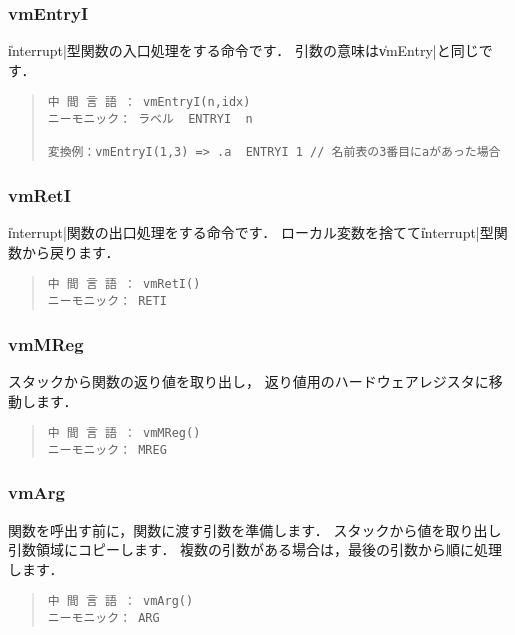 \subsubsection{vmEntryI}

\|interrupt|型関数の入口処理をする命令です．
引数の意味は\|vmEntry|と同じです．

\begin{quote}
\begin{verbatim}
中 間 言 語 ： vmEntryI(n,idx)
ニーモニック： ラベル  ENTRYI  n

変換例：vmEntryI(1,3) => .a  ENTRYI 1 // 名前表の3番目にaがあった場合
\end{verbatim}
\end{quote}

\subsubsection{vmRetI}

\|interrupt|関数の出口処理をする命令です．
ローカル変数を捨てて\|interrupt|型関数から戻ります．

\begin{quote}
\begin{verbatim}
中 間 言 語 ： vmRetI()
ニーモニック： RETI
\end{verbatim}
\end{quote}

\subsubsection{vmMReg}

スタックから関数の返り値を取り出し，
返り値用のハードウェアレジスタに移動します．

\begin{quote}
\begin{verbatim}
中 間 言 語 ： vmMReg()
ニーモニック： MREG
\end{verbatim}
\end{quote}

\subsubsection{vmArg}

関数を呼出す前に，関数に渡す引数を準備します．
スタックから値を取り出し引数領域にコピーします．
複数の引数がある場合は，最後の引数から順に処理します．

\begin{quote}
\begin{verbatim}
中 間 言 語 ： vmArg()
ニーモニック： ARG
\end{verbatim}
\end{quote}

